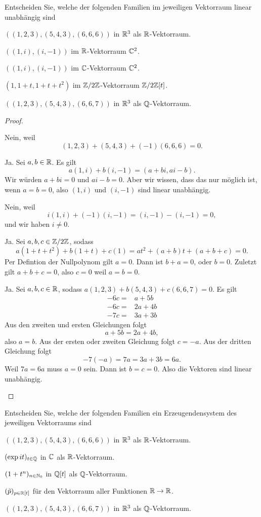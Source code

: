 \begin{Problem}
	Entscheiden Sie, welche der folgenden Familien im jeweiligen Vektorraum linear unabhängig sind
	\begin{parts}
	\item $((1, 2, 3), (5, 4, 3), (6, 6, 6))$ in $\mathbb{R}^3$ als $\mathbb{R}$-Vektorraum.
	\item $((1, i), (i, -1))$ im $\mathbb{R}$-Vektorraum $\mathbb{C}^2$.
	\item $((1, i), (i, -1))$ im $\mathbb{C}$-Vektorraum $\mathbb{C}^2$.
	\item $(1,1+t,1+t+t^2)$ im $\mathbb{Z} / 2\mathbb{Z}$-Vektorraum $\mathbb{Z} / 2\mathbb{Z}[t]$.
	\item $((1, 2, 3), (5, 4, 3), (6, 6, 7))$ in $\mathbb{R}^3$ als $\mathbb{Q}$-Vektorraum.
	\end{parts}
\end{Problem}
\begin{proof}
	\begin{parts}
	\item Nein, weil
		\[
			(1,2,3)+(5,4,3)+(-1)(6,6,6)=0
		.\] 
	\item Ja. Sei $a,b\in \mathbb{R}$. Es gilt
		\[
		a(1,i)+b(i,-1)=(a+bi,ai-b)
	.\]
	Wir würden $a+bi=0$ und $ai-b=0$. Aber wir wissen, dass das nur möglich ist, wenn $a=b=0$, also $(1,i)$ und $(i,-1)$ sind linear unabhängig.
\item Nein, weil
	\[
	i(1,i)+(-1)(i,-1)=(i,-1)-(i,-1)=0
	,\]
	und wir haben $i\neq 0$.
\item Ja. Sei $a,b,c\in \mathbb{Z} / 2\mathbb{Z}$, sodass
	\[
	a(1+t+t^2)+b(1+t)+c(1)=at^2+(a+b)t+(a+b+c)=0
	.\] 
	Per Defintion der Nullpolynom gilt $a=0$. Dann ist $b+a=0$, oder $b=0$. Zuletzt gilt $a+b+c=0$, also $c=0$ weil $a=b=0$.
\item  Ja. Sei $a,b,c\in \mathbb{R}$, sodass $a(1,2,3)+b(5,4,3)+c(6,6,7)=0$. Es gilt
\begin{align*}
	-6c=&a+5b\\
	-6c=&2a+4b\\
	-7c=&3a+3b
\end{align*}
Aus den zweiten und ersten Gleichungen folgt
\[
a+5b=2a+4b
,\]
also $a=b$. Aus der ersten oder zweiten Gleichung folgt $c=-a$. Aus der dritten Gleichung folgt
\[
-7(-a)=7a=3a+3b=6a
.\]
Weil $7a=6a$ muss $a=0$ sein. Dann ist $b=c=0$. Also die Vektoren sind linear unabhängig.\qedhere
	\end{parts} 
\end{proof}
\begin{Problem}
	Entscheiden Sie, welche der folgenden Familien ein Erzeugendensystem des jeweiligen Vektorraums sind
	\begin{parts}
	\item $((1, 2, 3), (5, 4, 3), (6, 6, 6))$ in $\mathbb{R}^3$ als  $\mathbb{R}$-Vektorraum.
	\item $(\exp it)_{t\in \mathbb{Q}}$ in $\mathbb{C}$ als $\mathbb{R}$-Vektorraum.
	\item $(1+t^n)_{n\in \mathbb{N}_0}$ in $\mathbb{Q}[t]$ als $\mathbb{Q}$-Vektorraum. 
	\item $(\tilde{p})_{p\in \mathbb{R}[t]}$ f\"{u}r den Vektorraum aller Funktionen $\mathbb{R}\to \mathbb{R}$.
	\item $((1, 2, 3), (5, 4, 3), (6, 6, 7))$ in $\mathbb{R}^3$ als $\mathbb{Q}$-Vektorraum. 
	\end{parts}
\end{Problem}
